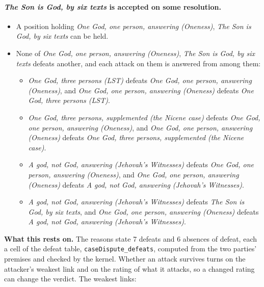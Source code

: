 \documentclass[11pt,paper=\testimonypaper,DIV=13,parskip=false]{scrartcl}
\begin{document}
\paragraph{\emph{The Son is God, by six texts} is accepted on some resolution.}
\begin{itemize}
\item A position holding \emph{One God, one person, answering (Oneness)}, \emph{The Son is God, by six texts} can be held.
\item None of \emph{One God, one person, answering (Oneness)}, \emph{The Son is God, by six texts} defeats another, and each attack on them is answered from among them:
\begin{itemize}
\item \emph{One God, three persons (LST)} defeats \emph{One God, one person, answering (Oneness)}, and \emph{One God, one person, answering (Oneness)} defeats \emph{One God, three persons (LST)}.
\item \emph{One God, three persons, supplemented (the Nicene case)} defeats \emph{One God, one person, answering (Oneness)}, and \emph{One God, one person, answering (Oneness)} defeats \emph{One God, three persons, supplemented (the Nicene case)}.
\item \emph{A god, not God, answering (Jehovah’s Witnesses)} defeats \emph{One God, one person, answering (Oneness)}, and \emph{One God, one person, answering (Oneness)} defeats \emph{A god, not God, answering (Jehovah’s Witnesses)}.
\item \emph{A god, not God, answering (Jehovah’s Witnesses)} defeats \emph{The Son is God, by six texts}, and \emph{One God, one person, answering (Oneness)} defeats \emph{A god, not God, answering (Jehovah’s Witnesses)}.
\end{itemize}
\end{itemize}
\par\noindent\textbf{What this rests on.} The reasons state 7 defeats and 6 absences of defeat, each a cell of the defeat table, \texttt{case\allowbreak{}Dispute\_\allowbreak{}defeats}, computed from the two parties' premises and checked by the kernel. Whether an attack survives turns on the attacker's weakest link and on the rating of what it attacks, so a changed rating can change the verdict. The weakest links:
\end{document}
